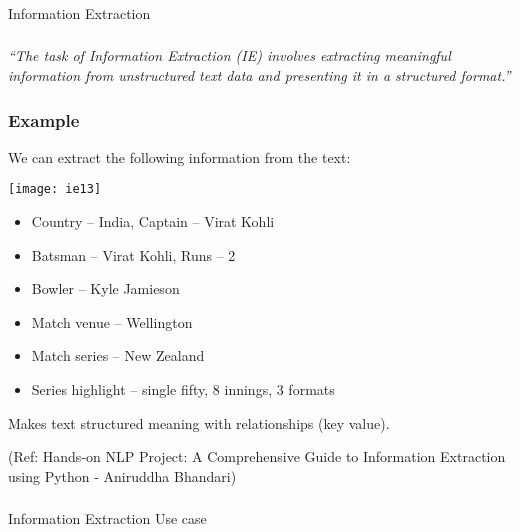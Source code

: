 \begin{frame}[fragile]\frametitle{}

\begin{center}
{\Large Information Extraction}
\end{center}
\end{frame}

\begin{frame}[fragile]\frametitle{}

\begin{center}
{\it ``The task of Information Extraction (IE) involves extracting meaningful information from unstructured text data and presenting it in a structured format.''}
\end{center}
\end{frame}


\begin{frame}[fragile]\frametitle{Example}

We can extract the following information from the text:


\begin{center}
\texttt{[image: ie13]}
\end{center}


	\begin{itemize}
	\item Country – India, Captain – Virat Kohli
	\item Batsman – Virat Kohli, Runs – 2
	\item Bowler – Kyle Jamieson
	\item Match venue – Wellington
	\item Match series – New Zealand
	\item Series highlight – single fifty, 8 innings, 3 formats
	\end{itemize}

Makes text structured meaning with relationships (key value).

{\tiny (Ref: Hands-on NLP Project: A Comprehensive Guide to Information Extraction using Python - Aniruddha Bhandari)}

\end{frame}


\begin{frame}[fragile]\frametitle{}

\begin{center}
{\Large Information Extraction Use case}
\end{center}
\end{frame}

